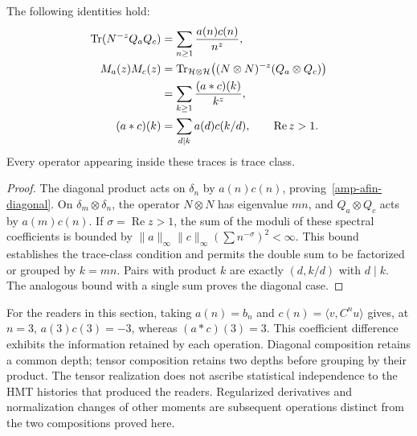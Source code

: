 \begin{proposition}
\label{amp-afin-prop-productos}
The following identities hold:
\begin{align}
 \operatorname{Tr}(N^{-z}Q_aQ_c)
 &=\sum_{n\geq1}\frac{a(n)c(n)}{n^z},
 \label{amp-afin-diagonal}\\
 M_a(z)M_c(z)
 &=\operatorname{Tr}_{\mathcal H\otimes\mathcal H}
 \bigl((N\otimes N)^{-z}(Q_a\otimes Q_c)\bigr)\notag\\
 &=\sum_{k\geq1}\frac{(a*c)(k)}{k^z},
 \label{amp-afin-tensor}\\
 (a*c)(k)&=\sum_{d\mid k}a(d)c(k/d),
 \qquad \operatorname{Re}z>1.
 \label{amp-afin-convolucion}
\end{align}
Every operator appearing inside these traces is trace class.
\end{proposition}
\begin{proof}
The diagonal product acts on $\delta_n$ by $a(n)c(n)$,
proving~\eqref{amp-afin-diagonal}.
On $\delta_m\otimes\delta_n$, the operator $N\otimes N$
has eigenvalue $mn$, and $Q_a\otimes Q_c$ acts by $a(m)c(n)$.
If $\sigma=\operatorname{Re}z>1$, the sum of the moduli of these
spectral coefficients is bounded by
$\|a\|_\infty\|c\|_\infty(\sum n^{-\sigma})^2<\infty$.
This bound establishes the trace-class condition and permits the
double sum to be factorized or grouped by $k=mn$.
Pairs with product $k$ are exactly $(d,k/d)$ with $d\mid k$.
The analogous bound with a single sum proves the diagonal case.
\end{proof}

For the readers in this section, taking $a(n)=b_n$ and
$c(n)=\langle v,C^nu\rangle$ gives, at $n=3$,
$a(3)c(3)=-3$, whereas $(a*c)(3)=3$.
This coefficient difference exhibits the information retained by
each operation. Diagonal composition retains a common depth;
tensor composition retains two depths before grouping by their product.
The tensor realization does not ascribe statistical independence
to the HMT histories that produced the readers.
Regularized derivatives and normalization changes of other moments
are subsequent operations distinct from the two compositions proved here.
